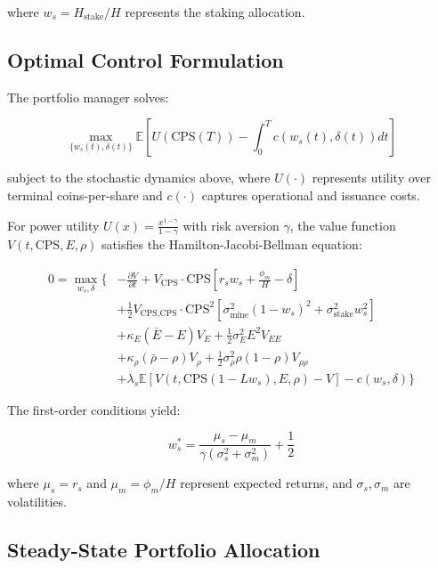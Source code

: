 \documentclass[
  journal=medium,
  manuscript=article-type,
  year=2025,
  volume=1,
]{cup-journal}
\theoremstyle{definition}
\begin{document}
where $w_s = H_{\text{stake}} / H$ represents the staking allocation.

\subsection{Optimal Control Formulation}

The portfolio manager solves:

\begin{equation}
\max_{\{w_s(t), \delta(t)\}} \mathbb{E}\left[ U(\text{CPS}(T)) - \int_0^T c(w_s(t), \delta(t)) dt \right]
\end{equation}

subject to the stochastic dynamics above, where $U(\cdot)$ represents utility over terminal coins-per-share and $c(\cdot)$ captures operational and issuance costs.

For power utility $U(x) = \frac{x^{1-\gamma}}{1-\gamma}$ with risk aversion $\gamma$, the value function $V(t, \text{CPS}, E, \rho)$ satisfies the Hamilton-Jacobi-Bellman equation:

\begin{align}
0 = \max_{w_s, \delta} \Bigg\{ &-\frac{\partial V}{\partial t} + V_{\text{CPS}} \cdot \text{CPS} \left[ r_s w_s + \frac{\phi_m}{H} - \delta \right] \\
&+ \frac{1}{2} V_{\text{CPS,CPS}} \cdot \text{CPS}^2 \left[ \sigma_{\text{mine}}^2 (1-w_s)^2 + \sigma_{\text{stake}}^2 w_s^2 \right] \\
&+ \kappa_E(\bar{E} - E) V_E + \frac{1}{2} \sigma_E^2 E^2 V_{EE} \\
&+ \kappa_\rho(\bar{\rho} - \rho) V_\rho + \frac{1}{2} \sigma_\rho^2 \rho(1-\rho) V_{\rho\rho} \\
&+ \lambda_s \mathbb{E}[V(t, \text{CPS}(1-Lw_s), E, \rho) - V] - c(w_s, \delta) \Bigg\}
\end{align}

The first-order conditions yield:

\begin{equation}
w_s^* = \frac{\mu_s - \mu_m}{\gamma (\sigma_s^2 + \sigma_m^2)} + \frac{1}{2}
\end{equation}

where $\mu_s = r_s$ and $\mu_m = \phi_m / H$ represent expected returns, and $\sigma_s, \sigma_m$ are volatilities.

\subsection{Steady-State Portfolio Allocation}
\end{document}
